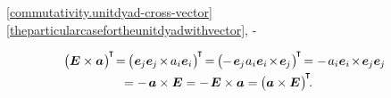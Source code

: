~\eqref{commutativity.unitdyad-cross-vector}
~\eqref{theparticularcasefortheunitdyadwithvector},
\hbox{\hspace{-0.2ex}\inquotes{${\hspace{-0.25ex}\times\hspace{-0.1ex}}$}\hspace{-0.2ex}-}
~

\nopagebreak\vspace{-0.5em}
\begin{multline}\label{skewsymmetryofunitdiadcrossvector}
\bigl( \UnitDyad \times \bm{a} \hspace{.1ex} \bigr)^{\hspace{-0.25ex}\T} \hspace{-0.4ex}
= \hspace{-0.2ex} \bigl( \hspace{.1ex} %
    \bm{e}_{\hspace{-0.1ex}j} \bm{e}_{\hspace{-0.1ex}j} \hspace{-0.25ex} \times \hspace{-0.2ex} a_i \bm{e}_i
\hspace{.1ex} \bigr)^{\hspace{-0.25ex}\T} \hspace{-0.33ex}
= \hspace{-0.2ex} \bigl( \hspace{-0.1ex} %
    - \hspace{.25ex} \bm{e}_{\hspace{-0.1ex}j} \hspace{.1ex} a_i \bm{e}_i \hspace{-0.3ex} \times \hspace{-0.3ex} \bm{e}_{\hspace{-0.1ex}j}
\hspace{.1ex} \bigr)^{\hspace{-0.25ex}\T} \hspace{-0.33ex}
= %
    - \hspace{.25ex} a_i \bm{e}_i \hspace{-0.3ex} \times \hspace{-0.3ex} \bm{e}_{\hspace{-0.1ex}j} \bm{e}_{\hspace{-0.1ex}j}
\\[-0.1em]
= - \hspace{.3ex}
\bm{a} \times \UnitDyad
= - \hspace{.25ex} \UnitDyad \times \bm{a}
= \hspace{-0.1ex} \bigl( \bm{a} \times \UnitDyad \hspace{.1ex} \bigr)^{\hspace{-0.25ex}\T}
\hspace{-0.4ex} .
\hspace{1em}
\end{multline}

